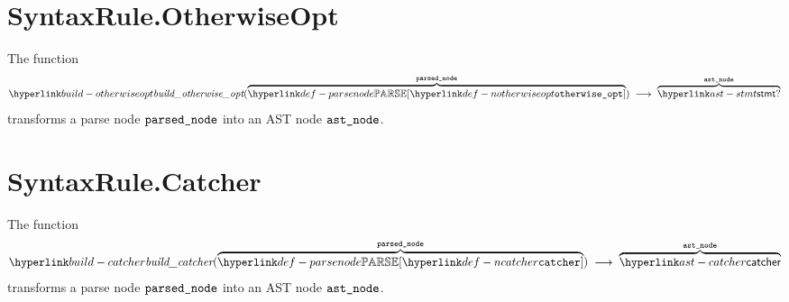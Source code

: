 \begin{mathpar}
\end{mathpar}

\section{SyntaxRule.OtherwiseOpt \label{sec:SyntaxRule.OtherwiseOpt}}
\hypertarget{build-otherwiseopt}{}
The function
\[
\buildotherwiseopt(\overname{\parsenode{\Notherwiseopt}}{\vparsednode}) \;\aslto\; \overname{\stmt?}{\vastnode}
\]
transforms a parse node $\vparsednode$ into an AST node $\vastnode$.

\begin{mathpar}
\end{mathpar}

\section{SyntaxRule.Catcher \label{sec:SyntaxRule.Catcher}}
\hypertarget{build-catcher}{}
The function
\[
\buildcatcher(\overname{\parsenode{\Ncatcher}}{\vparsednode}) \;\aslto\; \overname{\catcher}{\vastnode}
\]
transforms a parse node $\vparsednode$ into an AST node $\vastnode$.

\begin{mathpar}
\end{mathpar}

